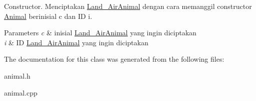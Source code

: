 Constructor. Menciptakan \hyperlink{classLand__AirAnimal}{Land\+\_\+\+Air\+Animal} dengan cara memanggil constructor \hyperlink{classAnimal}{Animal} berinisial c dan ID i. 


\begin{DoxyParams}{Parameters}
{\em c} & inisial \hyperlink{classLand__AirAnimal}{Land\+\_\+\+Air\+Animal} yang ingin diciptakan \\
\hline
{\em i} & ID \hyperlink{classLand__AirAnimal}{Land\+\_\+\+Air\+Animal} yang ingin diciptakan \\
\hline
\end{DoxyParams}


The documentation for this class was generated from the following files\+:\begin{DoxyCompactItemize}
\item 
animal.\+h\item 
animal.\+cpp\end{DoxyCompactItemize}

